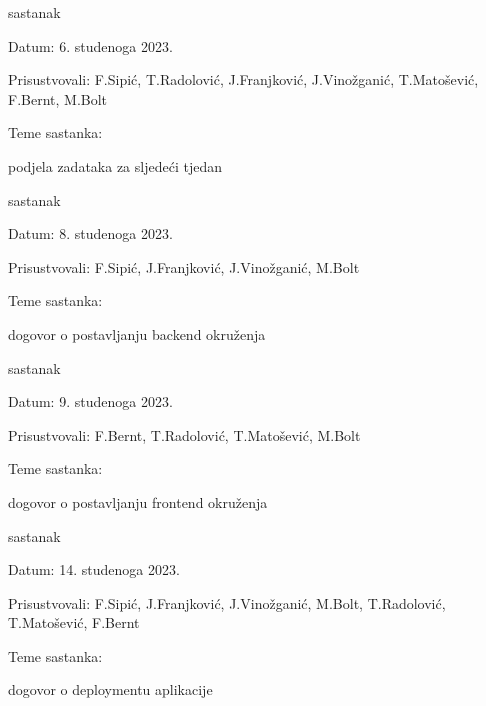 \begin{packed_enum}
			\item  sastanak
			\item[] \begin{packed_item}
				\item Datum: 6. studenoga 2023.
				\item Prisustvovali: F.Sipić, T.Radolović, J.Franjković, J.Vinožganić, T.Matošević, F.Bernt, M.Bolt
				\item Teme sastanka:
				\begin{packed_item}
					\item  podjela zadataka za sljedeći tjedan
				\end{packed_item}
			\end{packed_item}

			\item  sastanak
			\item[] \begin{packed_item}
				\item Datum: 8. studenoga 2023.
				\item Prisustvovali: F.Sipić, J.Franjković, J.Vinožganić, M.Bolt
				\item Teme sastanka:
				\begin{packed_item}
					\item  dogovor o postavljanju backend okruženja
				\end{packed_item}
			\end{packed_item}

			\item  sastanak
			\item[] \begin{packed_item}
				\item Datum: 9. studenoga 2023.
				\item Prisustvovali: F.Bernt, T.Radolović, T.Matošević, M.Bolt
				\item Teme sastanka:
				\begin{packed_item}
					\item  dogovor o postavljanju frontend okruženja
				\end{packed_item}
			\end{packed_item}

			\item  sastanak
			\item[] \begin{packed_item}
				\item Datum: 14. studenoga 2023.
				\item Prisustvovali: F.Sipić, J.Franjković, J.Vinožganić, M.Bolt, T.Radolović, T.Matošević, F.Bernt
				\item Teme sastanka:
				\begin{packed_item}
					\item  dogovor o deploymentu aplikacije
				\end{packed_item}
			\end{packed_item}


\end{packed_enum}
